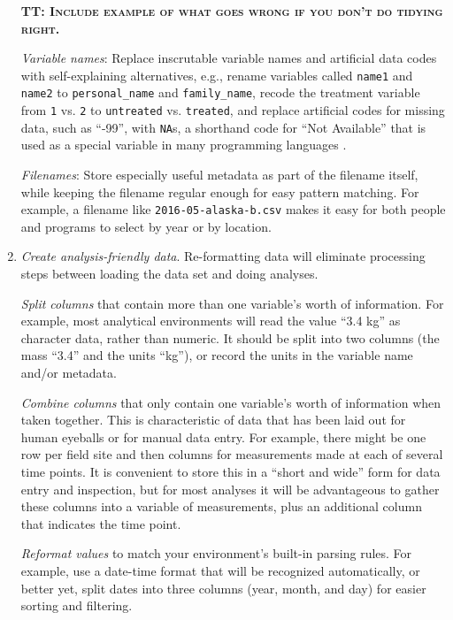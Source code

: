 \documentclass[10pt]{article}
\newcommand{\fixme}[2]{\textsc{\textbf{{#1}: {#2}}}}
\newcommand{\recommend}[1]{\textit{#1}}
\begin{document}
\begin{enumerate}
  \fixme{TT}{Include example of what goes wrong if you don't do tidying right.}

  \emph{Variable names}: Replace inscrutable variable names
  and artificial data codes with self-explaining alternatives, e.g.,
  rename variables called \texttt{name1} and \texttt{name2} to
  \texttt{personal\_name} and \texttt{family\_name}, recode the
  treatment variable from \texttt{1} vs.  \texttt{2} to
  \texttt{untreated} vs. \texttt{treated}, and replace artificial
  codes for missing data, such as ``-99'', with \texttt{NA}s,
  a shorthand code for ``Not Available'' that is used as a special variable
  in many programming languages \cite{white2013}.

  \emph{Filenames}: Store
  especially useful metadata as part of the filename itself, while
  keeping the filename regular enough for easy pattern matching. For
  example, a filename like \texttt{2016-05-alaska-b.csv} makes it easy
  for both people and programs to select by year or by location.

\item
  \recommend{Create analysis-friendly data}. Re-formatting data will
  eliminate processing steps between loading the
  data set and doing analyses.

  \emph{Split columns} that contain more
  than one variable's worth of information. For example, most analytical environments will read the value ``3.4 kg''
  as character data, rather than numeric. It should be split into two columns (the mass ``3.4'' and
  the units ``kg''), or record the units in the variable
  name and/or metadata.

  \emph{Combine columns} that only contain one variable's worth of
  information when taken together. This is
  characteristic of data that has been laid out for human eyeballs or
  for manual data entry.  For example, there might be one row per
  field site and then columns for measurements made at each of several
  time points. It is convenient to store this in a ``short and wide''
  form for data entry and inspection, but for most analyses it will be
  advantageous to gather these columns into a variable of
  measurements, plus an additional column that indicates the
  time point.

  \emph{Reformat values} to match your environment's built-in
  parsing rules. For example, use a date-time format that will be
  recognized automatically, or better yet, split dates into three
  columns (year, month, and day) for easier sorting and filtering.


\end{enumerate}
\end{document}
